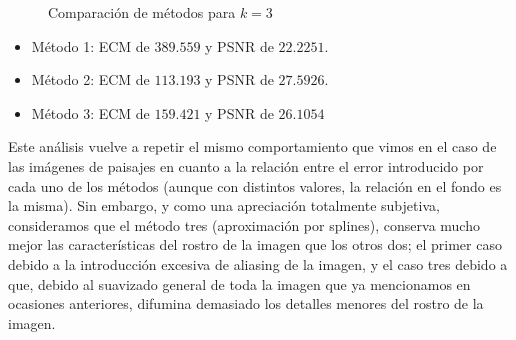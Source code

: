 \begin{figure}[H]
    \centering
    \qquad
    \qquad
    \caption{Comparación de métodos para $k = 3$}
    \label{fig:example}
\end{figure}


\begin{itemize}
 \item Método 1: ECM de $389.559$ y PSNR de $22.2251$.
 \item Método 2: ECM de $113.193$ y PSNR de $27.5926$.
 \item Método 3: ECM de $159.421$ y PSNR de $26.1054$
\end{itemize}

Este análisis vuelve a repetir el mismo comportamiento que vimos en el caso de las imágenes de paisajes en cuanto a la relación entre el error introducido por cada uno de los métodos (aunque con distintos valores, la relación en el fondo es la misma). Sin embargo, y como una apreciación totalmente subjetiva, consideramos que el método tres (aproximación por splines), conserva mucho mejor las características del rostro de la imagen que los otros dos; el primer caso debido a la introducción excesiva de aliasing de la imagen, y el caso tres debido a que, debido al suavizado general de toda la imagen que ya mencionamos en ocasiones anteriores, difumina demasiado los detalles menores del rostro de la imagen.

